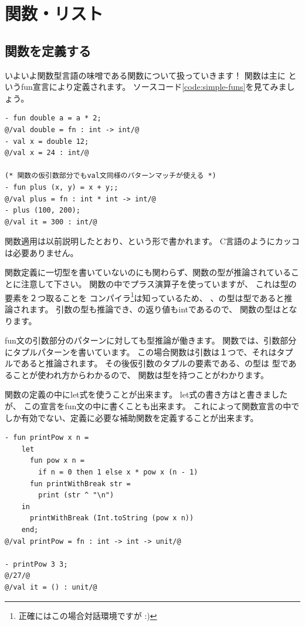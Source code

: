 \documentclass[11pt,a4paper]{jarticle}
\begin{document}
\section{関数・リスト}
\subsection{関数を定義する}
いよいよ関数型言語の味噌である関数について扱っていきます！
関数は主に
というfun宣言により定義されます。
ソースコード\ref{code:simple-funs}を見てみましょう。

\begin{lstlisting}[caption={単純な関数の定義},label={code:simple-funs}]
- fun double a = a * 2;
@/val double = fn : int -> int/@
- val x = double 12;
@/val x = 24 : int/@

(* 関数の仮引数部分でもval文同様のパターンマッチが使える *)
- fun plus (x, y) = x + y;;
@/val plus = fn : int * int -> int/@
- plus (100, 200);
@/val it = 300 : int/@
\end{lstlisting}

関数適用は以前説明したとおり、という形で書かれます。
C言語のようにカッコは必要ありません。

関数定義に一切型を書いていないのにも関わらず、関数の型が推論されていることに注意して下さい。
関数の中でプラス演算子を使っていますが、
これは型の要素を２つ取ることを
コンパイラ\footnote{正確にはこの場合対話環境ですが :)}は知っているため、
、の型は型であると推論されます。
引数の型も推論でき、の返り値もintであるので、
関数の型はとなります。

fun文の引数部分のパターンに対しても型推論が働きます。
関数では、引数部分にタプルパターンを書いています。
この場合関数は引数は１つで、それはタプルであると推論されます。
その後仮引数のタプルの要素である、の型は
型であることが使われ方からわかるので、
関数は型を持つことがわかります。

関数の定義の中にlet式を使うことが出来ます。
let式の書き方はと書きましたが、
この宣言をfun文の中に書くことも出来ます。
これによって関数宣言の中でしか有効でない、定義に必要な補助関数を定義することが出来ます。

\begin{lstlisting}[caption=ネストした関数宣言,label=code:nested-fun]
- fun printPow x n =
    let
      fun pow x n =
        if n = 0 then 1 else x * pow x (n - 1)
      fun printWithBreak str =
        print (str ^ "\n")
    in
      printWithBreak (Int.toString (pow x n))
    end;
@/val printPow = fn : int -> int -> unit/@

- printPow 3 3;
@/27/@
@/val it = () : unit/@
\end{lstlisting}
\end{document}

